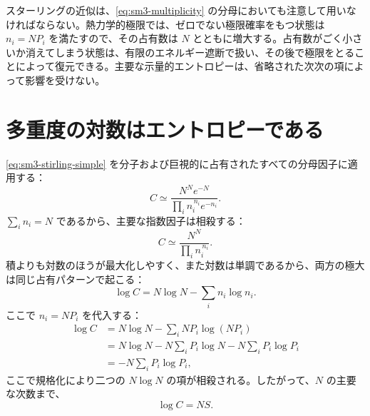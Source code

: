 \begin{classroomqa}
\end{classroomqa}

スターリングの近似は、\eqref{eq:sm3-multiplicity} の分母においても注意して用いなければならない。熱力学的極限では、ゼロでない極限確率をもつ状態は \(n_i=NP_i\) を満たすので、その占有数は \(N\) とともに増大する。占有数がごく小さいか消えてしまう状態は、有限のエネルギー遮断で扱い、その後で極限をとることによって復元できる。主要な示量的エントロピーは、省略された次次の項によって影響を受けない。

\section{多重度の対数はエントロピーである}

\eqref{eq:sm3-stirling-simple} を分子および巨視的に占有されたすべての分母因子に適用する：
\begin{equation}
 C\simeq
 \frac{N^Ne^{-N}}
 {\prod_i n_i^{\,n_i}e^{-n_i}}.
 \label{eq:sm3-c-stirling}
\end{equation}
\(\sum_i n_i=N\) であるから、主要な指数因子は相殺する：
\begin{equation}
 C\simeq\frac{N^N}{\prod_i n_i^{\,n_i}}.
 \label{eq:sm3-c-leading}
\end{equation}
積よりも対数のほうが最大化しやすく、また対数は単調であるから、両方の極大は同じ占有パターンで起こる：
\begin{equation}
 \log C=N\log N-\sum_i n_i\log n_i.
 \label{eq:sm3-logc-occupations}
\end{equation}
ここで \(n_i=NP_i\) を代入する：
\begin{align}
 \log C
 &=N\log N-\sum_iNP_i\log(NP_i)\\
 &=N\log N-N\sum_iP_i\log N
   -N\sum_iP_i\log P_i\\
 &=-N\sum_iP_i\log P_i,
 \label{eq:sm3-logc-entropy-derivation}
\end{align}
ここで規格化により二つの \(N\log N\) の項が相殺される。したがって、\(N\) の主要な次数まで、
\begin{equation}
 \boxed{\log C=NS}.
 \label{eq:sm3-logc-ns}
\end{equation}

